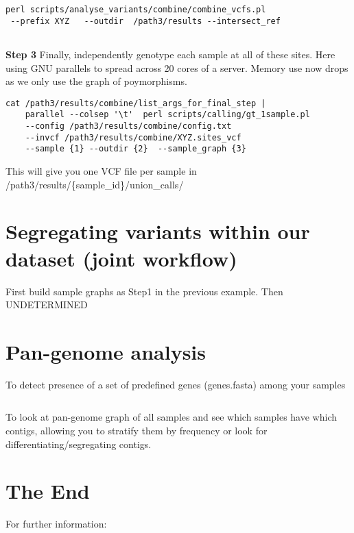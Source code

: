 \documentclass[a4paper,9pt]{extarticle}
\begin{document}
\begin{multicols*}{2}
\begin{verbatim}
perl scripts/analyse_variants/combine/combine_vcfs.pl 
 --prefix XYZ   --outdir  /path3/results --intersect_ref
   
\end{verbatim}
{\bf Step 3} Finally, independently genotype each sample at all of these sites. Here using GNU parallels to spread across 20 cores of a server. Memory use now drops as we only use the graph of poymorphisms.
\begin{verbatim}
cat /path3/results/combine/list_args_for_final_step | 
    parallel --colsep '\t'  perl scripts/calling/gt_1sample.pl
    --config /path3/results/combine/config.txt
    --invcf /path3/results/combine/XYZ.sites_vcf
    --sample {1} --outdir {2}  --sample_graph {3} 
\end{verbatim}
This will give you one VCF file per sample in \\
/path3/results/\{sample\_id\}/union\_calls/

\section{Segregating variants within our dataset (joint workflow)}
First build sample graphs as Step1 in the previous example. Then UNDETERMINED



\section{Pan-genome analysis}

To detect presence of a set of predefined genes (genes.fasta) among your samples
\begin{verbatim}
\end{verbatim}
To look at pan-genome graph of all samples and see which samples have which contigs, allowing you to stratify them by frequency or look for differentiating/segregating contigs.


\section{The End}

For further information:


\end{multicols*}
\end{document}
